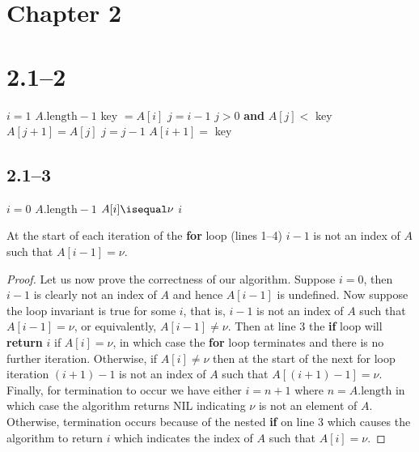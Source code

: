 \section{Chapter 2}
\label{sec:chp2}

\section*{2.1--2}

\begin{codebox}
	\li \For $i = 1$ \To $A.\text{length}-1$
	\li	\Do
				key $= A[i]$
	\li 	$j = i - 1$
	\li		\While $j > 0$ \textbf{and} $A[j] <$ key
	\li		\Do
					$A[j+1] = A[j]$
	\li			$j = j - 1$
				\End
	\li		$A[i+1] =$ key
			\End
\end{codebox}

\subsection*{2.1--3}

\begin{codebox}
	\li \For $i = 0$ \To $A.\text{length}-1$
	\li \Do
				\If $A[i] \isequal \nu$
	\li		\Then
					\Return $i$
				\End
			\End
	\li		\Return {}
\end{codebox}

\begin{invariant}
	At the start of each iteration of the \textbf{for} loop (lines 1--4) $i-1$ is not an index of $A$ such that $A[i-1]=\nu$.
\end{invariant}

\begin{proof}
	Let us now prove the correctness of our algorithm. Suppose $i=0$, then $i-1$ is clearly not an index of $A$ and hence $A[i-1]$ is undefined. Now suppose the loop invariant is true for some $i$, that is, $i-1$ is not an index of $A$ such that $A[i-1]=\nu$, or equivalently, $A[i-1]\neq\nu$. Then at line 3 the \textbf{if} loop will \textbf{return} $i$ if $A[i]=\nu$, in which case the \textbf{for} loop terminates and there is no further iteration. Otherwise, if $A[i]\neq\nu$ then at the start of the next for loop iteration $(i+1)-1$ is not an index of $A$ such that $A[(i+1)-1]=\nu$. Finally, for termination to occur we have either $i=n+1$ where $n=A.\text{length}$ in which case the algorithm returns NIL indicating $\nu$ is not an element of $A$. Otherwise, termination occurs because of the nested \textbf{if} on line 3 which causes the algorithm to return $i$ which indicates the index of $A$ such that $A[i]=\nu$.
\end{proof}

